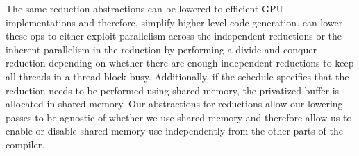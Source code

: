 The same reduction abstractions can be lowered to efficient GPU implementations
and therefore, simplify higher-level code generation. 
%
\Treebeard{} can lower these ops to either exploit
parallelism across the independent reductions or 
the inherent parallelism in the reduction by performing a divide and conquer 
reduction depending on whether there are enough independent reductions to keep all threads
in a thread block busy.
Additionally, if the schedule specifies that the reduction needs to be performed 
using shared memory, the privatized buffer is allocated in shared memory. 
Our abstractions for reductions allow our lowering passes to be 
agnostic of whether we use shared memory and therefore allow 
us to enable or disable shared memory use independently from the other 
parts of the compiler. 


